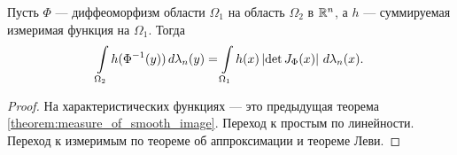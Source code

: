 \begin{crly}
 Пусть $\Phi$ --- диффеоморфизм области $\Omega_1$ на область $\Omega_2$ в $\mathbb{R}^{n}$, а $h$ --- суммируемая измеримая функция на $\Omega_1$. Тогда \begin{align*}
  \int\limits_{\Omega_2} h(\Phi^{-1}(y)) \, d\lambda_n(y) = \int\limits_{\Omega_1} h(x) \left| \det J_{\Phi}(x) \right| \, d\lambda_n(x)  
 .\end{align*} 
\end{crly}
\begin{proof}
 На характеристических функциях --- это предыдущая теорема  \ref{theorem:measure_of_smooth_image}. Переход к простым по линейности. Переход к измеримым по теореме об аппроксимации и теореме Леви.
\end{proof}


 
